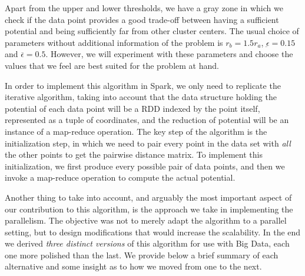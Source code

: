 Apart from the upper and lower thresholds, we have a gray zone in which we check if the data point provides a good trade-off between having a sufficient potential and being sufficiently far from other cluster centers. The usual choice of parameters without additional information of the problem is $r_b=1.5r_a$, $\underbar{\epsilon}=0.15$ and $\overbar{\epsilon}=0.5$. However, we will experiment with these parameters and choose the values that we feel are best suited for the problem at hand.

In order to implement this algorithm in Spark, we only need to replicate the iterative algorithm, taking into account that the data structure holding the potential of each data point will be a RDD indexed by the point itself, represented as a tuple of coordinates, and the reduction of potential will be an instance of a map-reduce operation. The key step of the algorithm is the initialization step, in which we need to pair every point in the data set with \textit{all} the other points to get the pairwise distance matrix. To implement this initialization, we first produce every possible pair of data points, and then we invoke a map-reduce operation to compute the actual potential.

Another thing to take into account, and arguably the most important aspect of our contribution to this algorithm, is the approach we take in implementing the parallelism. The objective was not to merely adapt the algorithm to a parallel setting, but to design modifications that would increase the scalability. In the end we derived \textit{three distinct versions} of this algorithm for use with Big Data, each one more polished than the last. We provide below a brief summary of each alternative and some insight as to how we moved from one to the next.

